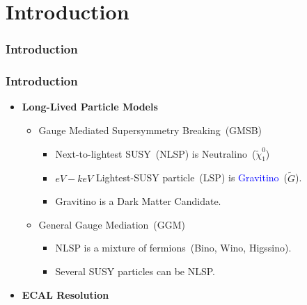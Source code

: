 \documentclass{beamer}
\begin{document}
\section{Introduction}
\begin{frame}
\frametitle{\Huge Introduction}

\frametitle{\Huge Introduction}
\begin{minipage}{0.8\paperwidth} 
     \begin{itemize}  
       \item{\color{UMN@Maroon} \textbf{Long-Lived Particle Models}}
      \large{
        \begin{itemize}
        \item Gauge Mediated Supersymmetry Breaking~(GMSB)
          \begin{itemize}
            \item Next-to-lightest SUSY~(NLSP) is \alert{Neutralino}~($\tilde{\chi}^{0}_{1}$)
            \item $eV-keV$ Lightest-SUSY particle~(LSP) is \textcolor{blue}{Gravitino}~($\tilde{G}$).
            \item Gravitino is a Dark Matter Candidate.
          \end{itemize}
        \item General Gauge Mediation~(GGM)
          \begin{itemize}
            \item NLSP is a mixture of fermions~(Bino, Wino, Higssino).
            \item Several SUSY particles can be NLSP.
          \end{itemize}
      \end{itemize}
    }   
  \item{ \color{UMN@Maroon} \textbf{ECAL Resolution}}    


\end{itemize}
\end{minipage}
\end{frame}
\end{document}
